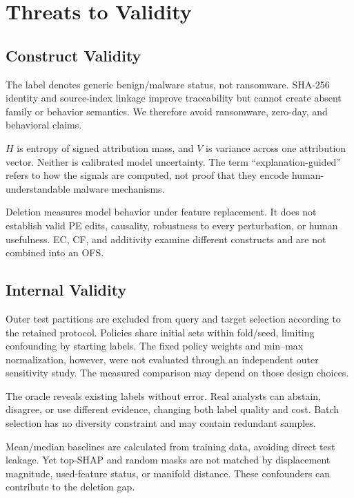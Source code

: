 \section{Threats to Validity}
\label{sec:threats}

\subsection{Construct Validity}

The label denotes generic benign/malware status, not ransomware. SHA-256 identity
and source-index linkage improve traceability but cannot create absent family or
behavior semantics. We therefore avoid ransomware, zero-day, and behavioral
claims.

$H$ is entropy of signed attribution mass, and $V$ is variance across one
attribution vector. Neither is calibrated model uncertainty. The term
``explanation-guided'' refers to how the signals are computed, not proof that they
encode human-understandable malware mechanisms.

Deletion measures model behavior under feature replacement. It does not establish
valid PE edits, causality, robustness to every perturbation, or human usefulness.
EC, CF, and additivity examine different constructs and are not combined into an
OFS.

\subsection{Internal Validity}

Outer test partitions are excluded from query and target selection according to
the retained protocol. Policies share initial sets within fold/seed, limiting
confounding by starting labels. The fixed policy weights and min--max
normalization, however, were not evaluated through an independent outer
sensitivity study. The measured comparison may depend on those design choices.

The oracle reveals existing labels without error. Real analysts can abstain,
disagree, or use different evidence, changing both label quality and cost. Batch
selection has no diversity constraint and may contain redundant samples.

Mean/median baselines are calculated from training data, avoiding direct test
leakage. Yet top-SHAP and random masks are not matched by displacement magnitude,
used-feature status, or manifold distance. These confounders can contribute to
the deletion gap.

